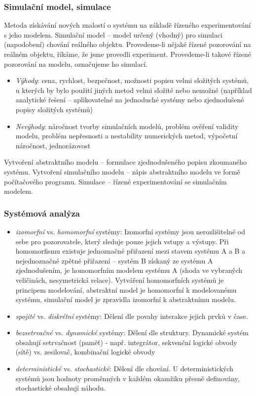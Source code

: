 \subsubsection*{Simulační model, simulace}
Metoda získávání nových znalostí o systému na základě řízeného experimentování s jeho modelem. Simulační model – model určený (vhodný) pro simulaci (napodobení) chování reálného objektu. Provedeme-li nějaké řízené pozorování na reálném objektu, říkáme, že jsme provedli experiment. Provedeme-li takové řízené pozorování na modelu, označujeme ho simulací.
\begin{itemize}
\item \textit{Výhody}: cena, rychlost, bezpečnost, možnosti popisu velmi složitých systémů, u kterých by bylo použití jiných metod velmi složité nebo nemožné (například analytické řešení – aplikovatelné na jednoduché systémy nebo zjednodušené popisy složitých systémů)
\item \textit{Nevýhody}: náročnost tvorby simulačních modelů, problém ověření validity modelu, problém nepřesnosti a nestability numerických metod, výpočetní náročnost, jednorázovost
\end{itemize}
\vspace{3cm}
Vytvoření abstraktního modelu – formulace zjednodušeného popisu zkoumaného systému. Vytvoření simulačního modelu – zápis abstraktního modelu ve formě počítačového programu. Simulace – řízené experimentování se simulačním modelem.

\subsubsection*{Systémová analýza}
\begin{itemize}
\item \textit{izomorfní} vs. \textit{homomorfní} systémy: Izomorfní systémy jsou nerozlišitelné od sebe pro pozorovatele, který sleduje pouze jejich
vstupy a výstupy. Při homomorfismu existuje jednoznačné přiřazení mezi stavem systému A a B a nejednoznačné zpětné přiřazení – systém B získaný ze systému A zjednodušením, je homomorfním modelem systému A (shoda ve vybraných veličinách, nesymetrická relace). Vytváření homomorfních systémů je principem modelování, abstraktní model je homomorfní k modelovanému systému, simulační model je zpravidla izomorfní k abstraktnímu modelu.
\item \textit{spojité} vs. \textit{diskrétní} systémy: Dělení dle povahy interakce jejich prvků v čase.
\item \textit{bezsetrvačné} vs. \textit{dynamické} systémy: Dělení dle struktury. Dynamické systém obsahují setrvačnost (paměť) - např. integrátor, sekvenční logické obvody (sítě) vs. zesilovač, kombinační logické obvody
\item \textit{deterministické} vs. \textit{stochastické}: Dělení dle chování. U deterministických systémů jsou hodnoty proměnných v každém okamžiku přesně definovány, stochastické obsahují náhodu.
\end{itemize}

